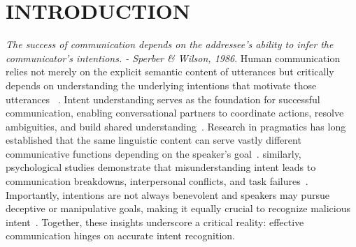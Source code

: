\pagestyle{plain} %
\setcounter{page}{1}


    

    

\chapter{\uppercase {Introduction}}
\textit{The success of communication depends on the addressee's ability to infer the communicator's intentions. - Sperber \& Wilson, 1986}. Human communication relies not merely on the explicit semantic content of utterances but critically depends on understanding the underlying intentions that motivate those utterances ~\cite{Austin1962, Searle1969, Grice1975}. Intent understanding serves as the foundation for successful communication, enabling conversational partners to coordinate actions, resolve ambiguities, and build shared understanding~\cite{Clark1996}. Research in pragmatics has long established that the same linguistic content can serve vastly different communicative functions depending on the speaker's goal~\cite{Levinson1983}. similarly, psychological studies demonstrate that misunderstanding intent leads to communication breakdowns, interpersonal conflicts, and task failures~\cite{Thomas1983, Keysar1994}. Importantly, intentions are not always benevolent and speakers may pursue deceptive or manipulative goals, making it equally crucial to recognize malicious intent~\cite{Ekman2001, DePaulo2003, Vrij2008}. Together, these insights underscore a critical reality: effective communication hinges on accurate intent recognition.

